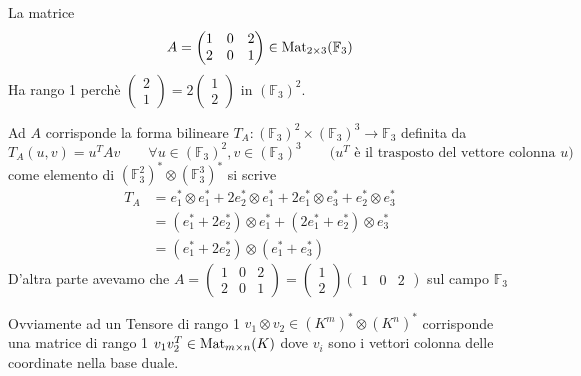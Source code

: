 \documentclass[../main.tex]{subfiles}
\begin{document}
\begin{example}
    La matrice
    \begin{equation*}
        A = \begin{pmatrix}
            1 & 0 & 2 \\
            2 & 0 & 1
        \end{pmatrix} \in \operatorname{Mat}_{2 \times 3}(\mathbb{F}_3)
    \end{equation*}
    Ha rango 1 perchè
    $\begin{pmatrix}
            2 \\
            1
        \end{pmatrix} = 2
        \begin{pmatrix}
            1 \\
            2
        \end{pmatrix}$ in $(\mathbb{F}_3)^2$.

    Ad $A$ corrisponde la forma bilineare $T_A: (\mathbb{F}_3)^2 \times (\mathbb{F}_3)^3 \rightarrow \mathbb{F}_3$ definita da
    \begin{equation*}
        T_A(u, v) = u^T A v \qquad \forall u \in (\mathbb{F}_3)^2, v \in (\mathbb{F}_3)^3 \qquad \text{($u^T$ è il trasposto del vettore colonna $u$)}
    \end{equation*}
    come elemento di $(\mathbb{F}_3^2)^* \otimes (\mathbb{F}_3^3)^*$ si scrive
    \begin{align*}
        T_A & = e_1^* \otimes e_1^* + 2 e_2^* \otimes e_1^* + 2 e_1^* \otimes e_3^* + e_2^* \otimes e_3^* \\
            & = (e_1^* + 2 e_2^*) \otimes e_1^* + (2 e_1^* + e_2^*) \otimes e_3^*                         \\
            & = (e_1^* + 2 e_2^*) \otimes (e_1^* + e_3^*)
    \end{align*}
    D'altra parte avevamo che $A = \begin{pmatrix}
            1 & 0 & 2 \\
            2 & 0 & 1
        \end{pmatrix} = \begin{pmatrix}
            1 \\
            2
        \end{pmatrix} \begin{pmatrix}
            1 & 0 & 2
        \end{pmatrix}$ sul campo $\mathbb{F}_3$
\end{example}

Ovviamente ad un Tensore di rango 1 $v_1 \otimes v_2 \in (K^m)^* \otimes (K^n)^*$ corrisponde una matrice di rango 1 $v_1 v_2^T \in \operatorname{Mat}_{m \times n}(K)$ dove $v_i$ sono i vettori colonna delle coordinate nella base duale.
\end{document}
